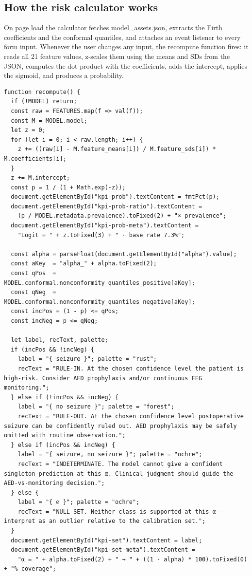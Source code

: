 \documentclass[11pt,a4paper]{article}
\begin{document}
\subsection{How the risk calculator works}
On page load the calculator fetches model\_assets.json, extracts the Firth coefficients and the conformal quantiles, and attaches an event listener to every form input. Whenever the user changes any input, the recompute function fires: it reads all 21 feature values, z-scales them using the means and SDs from the JSON, computes the dot product with the coefficients, adds the intercept, applies the sigmoid, and produces a probability.

\begin{lstlisting}[style=jsblock]
function recompute() {
  if (!MODEL) return;
  const raw = FEATURES.map(f => val(f));
  const M = MODEL.model;
  let z = 0;
  for (let i = 0; i < raw.length; i++) {
    z += ((raw[i] - M.feature_means[i]) / M.feature_sds[i]) * M.coefficients[i];
  }
  z += M.intercept;
  const p = 1 / (1 + Math.exp(-z));
  document.getElementById("kpi-prob").textContent = fmtPct(p);
  document.getElementById("kpi-prob-ratio").textContent =
    (p / MODEL.metadata.prevalence).toFixed(2) + "× prevalence";
  document.getElementById("kpi-prob-meta").textContent =
    "Logit = " + z.toFixed(3) + " · base rate 7.3%";

  const alpha = parseFloat(document.getElementById("alpha").value);
  const aKey  = "alpha_" + alpha.toFixed(2);
  const qPos  = MODEL.conformal.nonconformity_quantiles_positive[aKey];
  const qNeg  = MODEL.conformal.nonconformity_quantiles_negative[aKey];
  const incPos = (1 - p) <= qPos;
  const incNeg = p <= qNeg;

  let label, recText, palette;
  if (incPos && !incNeg) {
    label = "{ seizure }"; palette = "rust";
    recText = "RULE-IN. At the chosen confidence level the patient is high-risk. Consider AED prophylaxis and/or continuous EEG monitoring.";
  } else if (!incPos && incNeg) {
    label = "{ no seizure }"; palette = "forest";
    recText = "RULE-OUT. At the chosen confidence level postoperative seizure can be confidently ruled out. AED prophylaxis may be safely omitted with routine observation.";
  } else if (incPos && incNeg) {
    label = "{ seizure, no seizure }"; palette = "ochre";
    recText = "INDETERMINATE. The model cannot give a confident singleton prediction at this α. Clinical judgment should guide the AED-vs-monitoring decision.";
  } else {
    label = "{ ∅ }"; palette = "ochre";
    recText = "NULL SET. Neither class is supported at this α — interpret as an outlier relative to the calibration set.";
  }
  document.getElementById("kpi-set").textContent = label;
  document.getElementById("kpi-set-meta").textContent =
    "α = " + alpha.toFixed(2) + " → " + ((1 - alpha) * 100).toFixed(0) + "% coverage";


\end{lstlisting}
\end{document}
